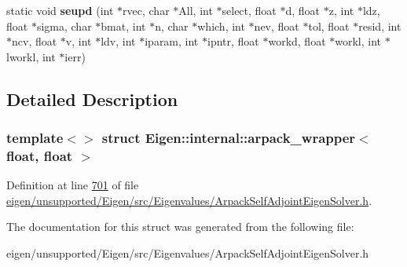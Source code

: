 \begin{DoxyCompactItemize}
\item 
\mbox{\label{struct_eigen_1_1internal_1_1arpack__wrapper_3_01float_00_01float_01_4_ad49524ccbbe2f6e5f2d3685c93712839}} 
static void {\bfseries seupd} (int $\ast$rvec, char $\ast$All, int $\ast$select, float $\ast$d, float $\ast$z, int $\ast$ldz, float $\ast$sigma, char $\ast$bmat, int $\ast$n, char $\ast$which, int $\ast$nev, float $\ast$tol, float $\ast$resid, int $\ast$ncv, float $\ast$v, int $\ast$ldv, int $\ast$iparam, int $\ast$ipntr, float $\ast$workd, float $\ast$workl, int $\ast$lworkl, int $\ast$ierr)
\end{DoxyCompactItemize}


\subsection{Detailed Description}
\subsubsection*{template$<$$>$\newline
struct Eigen\+::internal\+::arpack\+\_\+wrapper$<$ float, float $>$}



Definition at line \hyperlink{eigen_2unsupported_2_eigen_2src_2_eigenvalues_2_arpack_self_adjoint_eigen_solver_8h_source_l00701}{701} of file \hyperlink{eigen_2unsupported_2_eigen_2src_2_eigenvalues_2_arpack_self_adjoint_eigen_solver_8h_source}{eigen/unsupported/\+Eigen/src/\+Eigenvalues/\+Arpack\+Self\+Adjoint\+Eigen\+Solver.\+h}.



The documentation for this struct was generated from the following file\+:\begin{DoxyCompactItemize}
\item 
eigen/unsupported/\+Eigen/src/\+Eigenvalues/\+Arpack\+Self\+Adjoint\+Eigen\+Solver.\+h\end{DoxyCompactItemize}
